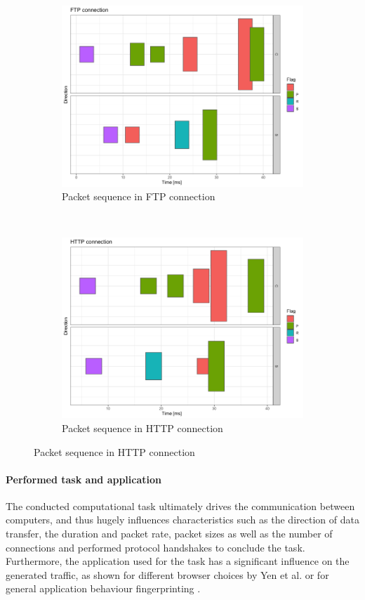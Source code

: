\documentclass{article}
\begin{document}
\begin{figure}
\centering
\begin{subfigure}[b]{0.46\textwidth}
\includegraphics[width=\textwidth]{images/FTP.png}
\caption{Packet sequence in FTP connection}
\end{subfigure}
~
\begin{subfigure}[b]{0.46\textwidth}
\includegraphics[width=\textwidth]{images/HTTP.png}
\caption{Packet sequence in HTTP connection}
\end{subfigure}
\end{figure}
 
\paragraph{Performed task and application}
The conducted computational task ultimately drives the communication between computers, and thus hugely influences characteristics such as the direction of data transfer, the duration and packet rate, packet sizes as well as the number of connections and performed protocol handshakes to conclude the task. Furthermore, the application used for the task has a significant influence on the generated traffic, as shown for different browser choices by Yen et al. \cite{yen2009browser} or for general application behaviour fingerprinting \cite{stober2013you}. 
\end{document}
